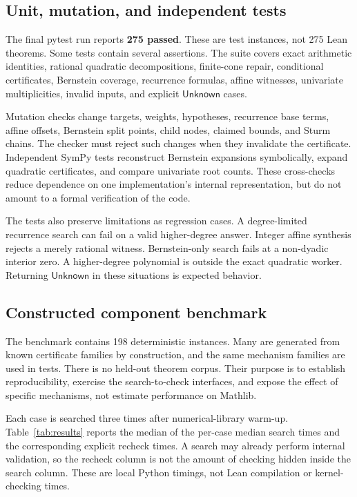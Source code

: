 \documentclass[11pt,a4paper]{article}
\theoremstyle{definition}
\newcommand{\unknown}{\ensuremath{\mathsf{Unknown}}}
\begin{document}
\subsection{Unit, mutation, and independent tests}

The final pytest run reports \textbf{275 passed}. These are test instances, not 275 Lean theorems. Some tests contain several assertions. The suite covers exact arithmetic identities, rational quadratic decompositions, finite-cone repair, conditional certificates, Bernstein coverage, recurrence formulas, affine witnesses, univariate multiplicities, invalid inputs, and explicit \unknown{} cases.

Mutation checks change targets, weights, hypotheses, recurrence base terms, affine offsets, Bernstein split points, child nodes, claimed bounds, and Sturm chains. The checker must reject such changes when they invalidate the certificate. Independent SymPy tests reconstruct Bernstein expansions symbolically, expand quadratic certificates, and compare univariate root counts. These cross-checks reduce dependence on one implementation's internal representation, but do not amount to a formal verification of the code.

The tests also preserve limitations as regression cases. A degree-limited recurrence search can fail on a valid higher-degree answer. Integer affine synthesis rejects a merely rational witness. Bernstein-only search fails at a non-dyadic interior zero. A higher-degree polynomial is outside the exact quadratic worker. Returning \unknown{} in these situations is expected behavior.

\subsection{Constructed component benchmark}

The benchmark contains 198 deterministic instances. Many are generated from known certificate families by construction, and the same mechanism families are used in tests. There is no held-out theorem corpus. Their purpose is to establish reproducibility, exercise the search-to-check interfaces, and expose the effect of specific mechanisms, not estimate performance on Mathlib.

Each case is searched three times after numerical-library warm-up. Table~\ref{tab:results} reports the median of the per-case median search times and the corresponding explicit recheck times. A search may already perform internal validation, so the recheck column is not the amount of checking hidden inside the search column. These are local Python timings, not Lean compilation or kernel-checking times.
\end{document}
